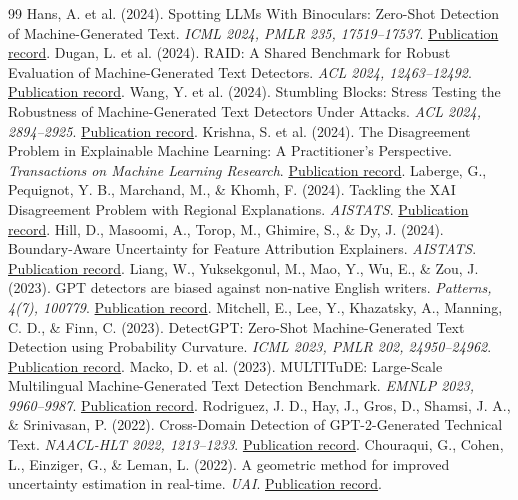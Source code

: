 \begin{thebibliography}{99}
 Hans, A. et al. (2024). Spotting LLMs With Binoculars: Zero-Shot Detection of Machine-Generated Text. \emph{ICML 2024, PMLR 235, 17519–17537}. \href{https://proceedings.mlr.press/v235/hans24a.html}{Publication record}.
 Dugan, L. et al. (2024). RAID: A Shared Benchmark for Robust Evaluation of Machine-Generated Text Detectors. \emph{ACL 2024, 12463–12492}. \href{https://aclanthology.org/2024.acl-long.674/}{Publication record}.
 Wang, Y. et al. (2024). Stumbling Blocks: Stress Testing the Robustness of Machine-Generated Text Detectors Under Attacks. \emph{ACL 2024, 2894–2925}. \href{https://aclanthology.org/2024.acl-long.160/}{Publication record}.
 Krishna, S. et al. (2024). The Disagreement Problem in Explainable Machine Learning: A Practitioner's Perspective. \emph{Transactions on Machine Learning Research}. \href{https://arxiv.org/abs/2202.01602}{Publication record}.
 Laberge, G., Pequignot, Y. B., Marchand, M., \& Khomh, F. (2024). Tackling the XAI Disagreement Problem with Regional Explanations. \emph{AISTATS}. \href{https://proceedings.mlr.press/v238/laberge24a.html}{Publication record}.
 Hill, D., Masoomi, A., Torop, M., Ghimire, S., \& Dy, J. (2024). Boundary-Aware Uncertainty for Feature Attribution Explainers. \emph{AISTATS}. \href{https://proceedings.mlr.press/v238/hill24a.html}{Publication record}.
 Liang, W., Yuksekgonul, M., Mao, Y., Wu, E., \& Zou, J. (2023). GPT detectors are biased against non-native English writers. \emph{Patterns, 4(7), 100779}. \href{https://doi.org/10.1016/j.patter.2023.100779}{Publication record}.
 Mitchell, E., Lee, Y., Khazatsky, A., Manning, C. D., \& Finn, C. (2023). DetectGPT: Zero-Shot Machine-Generated Text Detection using Probability Curvature. \emph{ICML 2023, PMLR 202, 24950–24962}. \href{https://proceedings.mlr.press/v202/mitchell23a.html}{Publication record}.
 Macko, D. et al. (2023). MULTITuDE: Large-Scale Multilingual Machine-Generated Text Detection Benchmark. \emph{EMNLP 2023, 9960–9987}. \href{https://aclanthology.org/2023.emnlp-main.616/}{Publication record}.
 Rodriguez, J. D., Hay, J., Gros, D., Shamsi, J. A., \& Srinivasan, P. (2022). Cross-Domain Detection of GPT-2-Generated Technical Text. \emph{NAACL-HLT 2022, 1213–1233}. \href{https://aclanthology.org/2022.naacl-main.88/}{Publication record}.
 Chouraqui, G., Cohen, L., Einziger, G., \& Leman, L. (2022). A geometric method for improved uncertainty estimation in real-time. \emph{UAI}. \href{https://proceedings.mlr.press/v180/chouraqui22a.html}{Publication record}.

\end{thebibliography}
